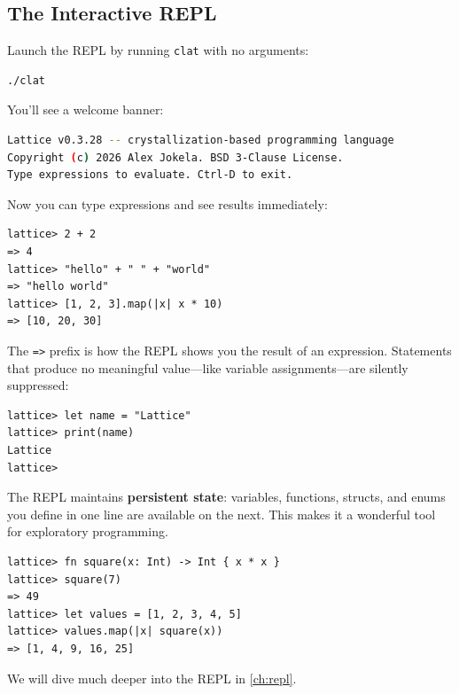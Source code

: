 \subsection{The Interactive REPL}\label{subsec:interactive-repl}

Launch the REPL by running \texttt{clat} with no arguments:

\begin{lstlisting}[language=bash, numbers=none]
./clat
\end{lstlisting}

You'll see a welcome banner:

\begin{lstlisting}[language=bash, numbers=none]
Lattice v0.3.28 -- crystallization-based programming language
Copyright (c) 2026 Alex Jokela. BSD 3-Clause License.
Type expressions to evaluate. Ctrl-D to exit.
\end{lstlisting}

Now you can type expressions and see results immediately:

\begin{lstlisting}[language=Lattice, numbers=none]
lattice> 2 + 2
=> 4
lattice> "hello" + " " + "world"
=> "hello world"
lattice> [1, 2, 3].map(|x| x * 10)
=> [10, 20, 30]
\end{lstlisting}

The \lstinline|=>| prefix is how the REPL shows you the result of an expression.
Statements that produce no meaningful value---like variable assignments---are silently suppressed:

\begin{lstlisting}[language=Lattice, numbers=none]
lattice> let name = "Lattice"
lattice> print(name)
Lattice
lattice>
\end{lstlisting}

The REPL maintains \textbf{persistent state}: variables, functions, structs, and enums you define in one line are available on the next.
This makes it a wonderful tool for exploratory programming.

\begin{lstlisting}[language=Lattice, numbers=none]
lattice> fn square(x: Int) -> Int { x * x }
lattice> square(7)
=> 49
lattice> let values = [1, 2, 3, 4, 5]
lattice> values.map(|x| square(x))
=> [1, 4, 9, 16, 25]
\end{lstlisting}

We will dive much deeper into the REPL in \cref{ch:repl}.

